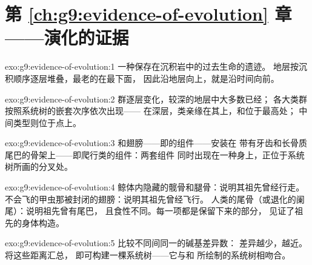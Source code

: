 \section*{第 \ref{ch:g9:evidence-of-evolution} 章——演化的证据}

\begin{solution}{exo:g9:evidence-of-evolution:1}
一种保存在沉积岩中的过去生命的遗迹。
地层按沉积顺序逐层堆叠，最老的在最下面，
因此沿地层向上，就是沿时间向前。
\end{solution}

\begin{solution}{exo:g9:evidence-of-evolution:2}
群逐层变化，较深的地层中大多数已经；
各大类群按照系统树的嵌套次序依次出现——
在深层，类亲缘在其上，和位于最高处；
中间类型则位于点上。
\end{solution}

\begin{solution}{exo:g9:evidence-of-evolution:3}
和翅膀——即的组件——安装在
带有牙齿和长骨质尾巴的骨架上——即爬行类的组件：两套组件
同时出现在一种身上，正位于系统树所画的分叉处。
\end{solution}

\begin{solution}{exo:g9:evidence-of-evolution:4}
鲸体内隐藏的髋骨和腿骨：说明其祖先曾经行走。
不会飞的甲虫那被封闭的翅膀：说明其祖先曾经飞行。
人类的尾骨（或退化的阑尾）：说明祖先曾有尾巴，
且食性不同。每一项都是保留下来的部分，
见证了祖先的身体构造。
\end{solution}

\begin{solution}{exo:g9:evidence-of-evolution:5}
比较不同间同一的碱基差异数：
差异越少，越近。将这些距离汇总，
即可构建一棵系统树——它与和
所绘制的系统树相吻合。
\end{solution}

